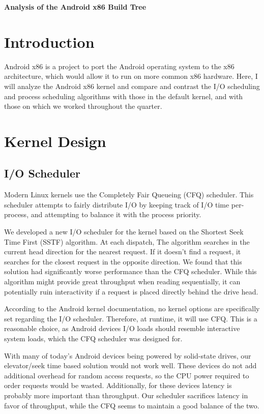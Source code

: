 \documentclass[12pt,letterpaper]{article}
\begin{document}
{\center\Large\textbf{Analysis of the Android x86 Build Tree} \\}

\section{Introduction}

Android x86 is a project to port the Android operating system to the x86
architecture, which would allow it to run on more common x86 hardware. Here, I
will analyze the Android x86 kernel and compare and contrast the I/O scheduling
and process scheduling algorithms with those in the default kernel, and with
those on which we worked throughout the quarter.

\section{Kernel Design}

\subsection{I/O Scheduler}

Modern Linux kernels use the Completely Fair Queueing (CFQ) scheduler. This
scheduler attempts to fairly distribute I/O by keeping track of I/O time
per-process, and attempting to balance it with the process priority.

We developed a new I/O scheduler for the kernel based on the Shortest Seek Time
First (SSTF) algorithm. At each dispatch, The algorithm searches in the current
head direction for the nearest request. If it doesn't find a request, it
searches for the closest request in the opposite direction. We found that this
solution had significantly worse performance than the CFQ scheduler. While this
algorithm might provide great throughput when reading sequentially, it can
potentially ruin interactivity if a request is placed directly behind the drive
head.

According to the Android kernel documentation, no kernel options are
specifically set regarding the I/O scheduler. Therefore, at runtime, it will use
CFQ. This is a reasonable choice, as Android devices I/O loads should resemble
interactive system loads, which the CFQ scheduler was designed for.

With many of today's Android devices being powered by solid-state drives, our
elevator/seek time based solution would not work well. These devices do not add
additional overhead for random access requests, so the CPU power required to
order requests would be wasted. Additionally, for these devices latency is
probably more important than throughput. Our scheduler sacrifices latency in
favor of throughput, while the CFQ seems to maintain a good balance of the two.
\end{document}
